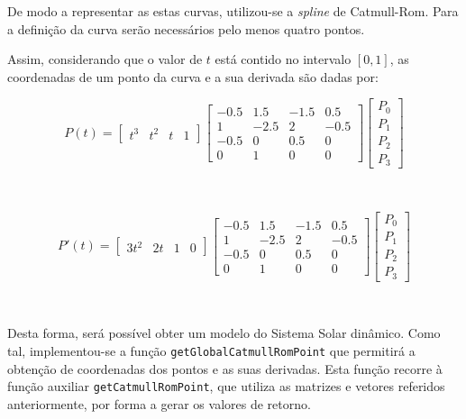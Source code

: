 \documentclass[a4paper, 11pt]{article}
\begin{document}
De modo a representar as estas curvas, utilizou-se a \textit{spline} de Catmull-Rom. Para a 
definição da curva serão necessários pelo menos quatro pontos.

Assim, considerando que o valor de $t$ está contido no intervalo $\left[ 0, 1 \right]$, as 
coordenadas de um ponto da curva e a sua derivada são dadas por:

\begin{equation*}
    P(t) = \begin{bmatrix} t^3 & t^2 & t & 1 \end{bmatrix}
           \begin{bmatrix}
        -0.5 & 1.5 & -1.5 & 0.5 \\
        1 & -2.5 & 2 & -0.5 \\
        -0.5 & 0 & 0.5 & 0 \\
        0 & 1 & 0 & 0
        \end{bmatrix}
           \begin{bmatrix} P_0 \\ P_1 \\ P_2 \\ P_3 \end{bmatrix}
\end{equation*}

\

\begin{equation*}
    P'(t) = \begin{bmatrix} 3t^2 & 2t & 1 & 0 \end{bmatrix}
    \begin{bmatrix}
        -0.5 & 1.5 & -1.5 & 0.5 \\
        1 & -2.5 & 2 & -0.5 \\
        -0.5 & 0 & 0.5 & 0 \\
        0 & 1 & 0 & 0
        \end{bmatrix}
            \begin{bmatrix} P_0 \\ P_1 \\ P_2 \\ P_3 \end{bmatrix}
\end{equation*}

\

Desta forma, será possível obter um modelo do Sistema Solar dinâmico. Como tal, implementou-se a 
função \texttt{getGlobalCatmullRomPoint} que permitirá a obtenção de coordenadas dos pontos e 
as suas derivadas. Esta função recorre à função auxiliar \texttt{getCatmullRomPoint}, que 
utiliza as matrizes e vetores referidos anteriormente, por forma a gerar os valores de retorno.
\end{document}
